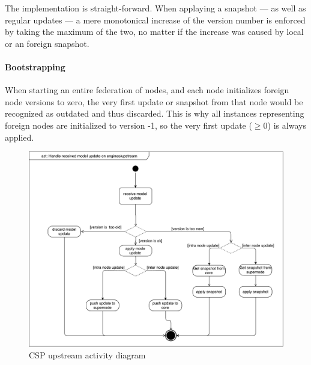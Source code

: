 The implementation is straight-forward. When applaying a snapshot --- as well as regular
updates --- a mere monotonical increase of the version number is enforced by
taking the maximum of the two, no matter if the increase was caused by local or
an foreign snapshot.

\paragraph{Bootstrapping}
When starting an entire federation of nodes, and each node initializes foreign
node versions to zero, the very first update or snapshot from that node would
be recognized as outdated and thus discarded. This is why all
 instances representing foreign nodes are
initialized to version -1, so the very first update ($\geqslant 0$) is always
applied.

\begin{figure}[]
	\includegraphics[width=\textwidth]{img/activity_diagram_upstream.pdf}
	\caption{CSP upstream activity diagram}
	\label{fig:csp:upstream:activty:diagram}
\end{figure}

